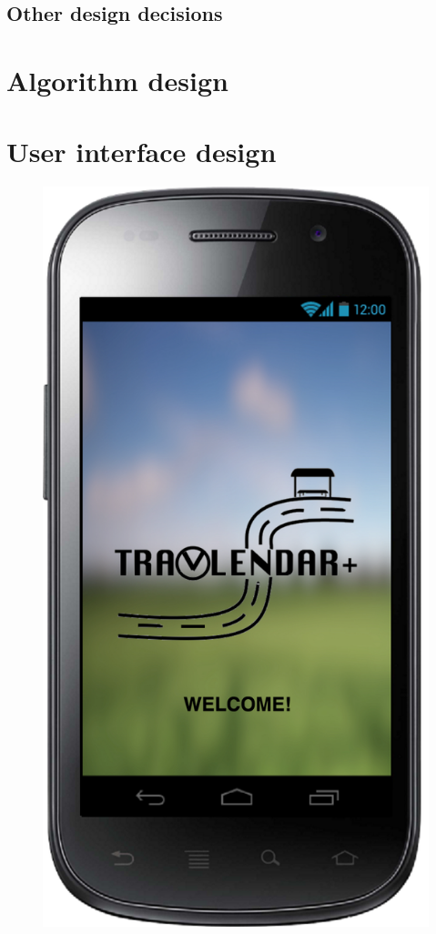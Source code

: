 \documentclass[a4paper,leqno]{article}
\begin{document}
\subsection{Other design decisions}

\newpage
\section{Algorithm design}

\newpage
\section{User interface design}

\begin{figure}
\begin{minipage}[!h]{0.45\linewidth}
	\centering
	\includegraphics[scale=0.15]{startPage}

\end{minipage}
\end{figure}
\end{document}
